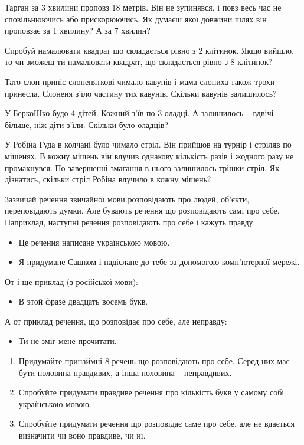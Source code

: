 \problem
Тарган за 3 хвилини проповз 18 метрів.
Він не зупинявся, і повз весь час не сповільнюючись або прискорюючись.
Як думаєш якої довжини шлях він проповзає за 1 хвилину?
А за 7 хвилин?


\problem
Спробуй намалювати квадрат що складається рівно з 2 клітинок.
Якщо вийшло, то чи зможеш ти намалювати квадрат,
що складається рівно з 8 клітинок?


\problem
Тато-слон приніс слоненяткові чимало кавунів
і мама-слониха також трохи принесла.
Слоненя з’їло частину тих кавунів.
Скільки кавунів залишилось?


\problem
У БеркоШко будо 4 дітей. Кожний з’їв по 3 оладці.
А залишилось – вдвічі більше, ніж діти з’їли.
Скільки було оладців?


\problem
У Робіна Гуда в колчані було чимало стріл.
Він прийшов на турнір і стріляв по мішенях.
В кожну мішень він влучив однакову кількість разів
і жодного разу не промахнувся.
По завершенні змагання в нього залишилось трішки стріл.
Як дізнатись, скільки стріл Робіна влучило в кожну мішень?


\problem
Зазвичай речення звичайної мови розповідають про людей, об'єкти,
переповідають думки.
Але бувають речення що розповідають самі про себе.
Наприклад, наступні речення розповідають про себе і кажуть правду:
\begin{itemize}
    \item Це речення написане українською мовою.
    \item Я придумане Сашком і надіслане до тебе
    за допомогою комп’ютерної мережі.
\end{itemize}
От і ще приклад (з російської мови):
\begin{itemize}
    \item В этой фразе двадцать восемь букв.
\end{itemize}
А от приклад речення, що розповідає про себе, але неправду:
\begin{itemize}
    \item Ти не зміг мене прочитати.
\end{itemize}

\begin{enumerate}
    \item Придумайте принаймні 8 речень що розповідають про себе.
    Серед них має бути половина правдивих, а інша половина – неправдивих.
    \item Спробуйте придумати правдиве речення про кількість букв
    у самому собі українською мовою. 
    \item Спробуйте придумати речення що розповідає саме про себе,
    але не вдається визначити чи воно правдиве, чи ні.
\end{enumerate}


